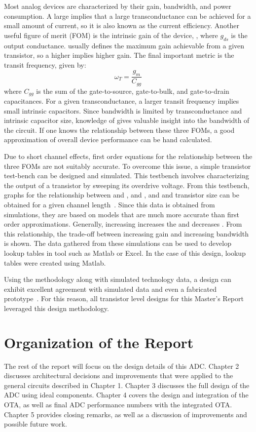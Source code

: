 Most analog devices are characterized by their gain, bandwidth, and power consumption. A large \gmid\spc implies that a large transconductance can be achieved for a small amount of current, so it is also known as the current efficiency. Another useful figure of merit (FOM) is the intrinsic gain of the device, \gmgds, where $g_{ds}$ is the output conductance. \gmgds\spc usually defines the maximum gain achievable from a given transistor, so a higher \gmgds\spc implies higher gain. The final important metric is the transit frequency, given by:
\begin{equation}
\label{eq:transitfrequency}
\omega_{T} = \dfrac{g_{m}}{C_{gg}}
\end{equation}
where $C_{gg}$ is the sum of the gate-to-source, gate-to-bulk, and gate-to-drain capacitances. For a given transconductance, a larger transit frequency implies small intrinsic capacitors. Since bandwidth is limited by 
transconductance and intrinsic capacitor size, knowledge of \transit\spc gives valuable insight into the bandwidth of the circuit. If one knows the relationship between these three FOMs, a good approximation of overall device 
performance can be hand calculated.

Due to short channel effects, first order equations for the relationship between the three FOMs are not suitably accurate. To overcome this issue, a simple transistor test-bench can be designed and simulated. This testbench involves characterizing the output of a transistor by sweeping its overdrive voltage. From this testbench, graphs for the relationship between \gmid\spc and \gmgds, \gmid\spc and \transit, and \gmid\spc and transistor size can be obtained for a given channel length~\cite{315areader}. Since this data is obtained from simulations, they are based on models that are much more accurate than first order approximations. Generally, increasing \gmid\spc increases the \gmgds\spc and decreases \transit. From this relationship, the trade-off between increasing gain and increasing bandwidth is shown. The data gathered from these simulations can be used to develop lookup tables in tool such as Matlab or Excel. In the case of this design, lookup tables were created using Matlab. 

Using the \gmid\spc methodology along with simulated technology data, a design can exhibit excellent agreement with simulated data and even a fabricated prototype~\cite{535416}. For this reason, all transistor level designs for this Master's Report leveraged this design methodology. 
\section{Organization of the Report}
The rest of the report will focus on the design details of this ADC. Chapter 2 discusses architectural decisions and improvements that were applied to the general circuits described in Chapter 1. Chapter 3 discusses the full design of the ADC using ideal components. Chapter 4 covers the design and integration of the OTA, as well as final ADC performance numbers with the integrated OTA. Chapter 5 provides closing remarks, as well as a discussion of improvements and possible future work. 